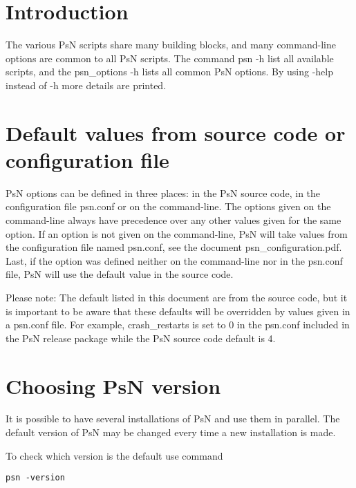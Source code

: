 



\maketitle

\section{Introduction}
The various PsN scripts share many building blocks, and many command-line options are common to all PsN scripts. The command psn -h list all available scripts, and the psn\_options -h lists all common PsN options. By using -help instead of -h more details are printed. 

\section{Default values from source code or configuration file}
PsN options can be defined in three places: in the PsN source code, in the configuration file psn.conf or on the command-line. The options given on the command-line always have precedence over any other values given for the same option. If an option is not given on the command-line, PsN will take values from the configuration file named psn.conf, see the document psn\_configuration.pdf. Last, if the option was defined neither on the command-line nor in the psn.conf file, PsN will use the default value in the source code. 

Please note: The default listed in this document are from the source code, but it is important to be aware that these defaults will be overridden by values given in a psn.conf file. For example, crash\_restarts is set to 0 in the psn.conf included in the PsN release package while the PsN source code default is 4. 

\section{Choosing PsN version}
It is possible to have several installations of PsN and use them in parallel. The default version of PsN may be changed every time a new installation is made. 

To check which version is the default use command
\begin{verbatim}
psn -version
\end{verbatim}

